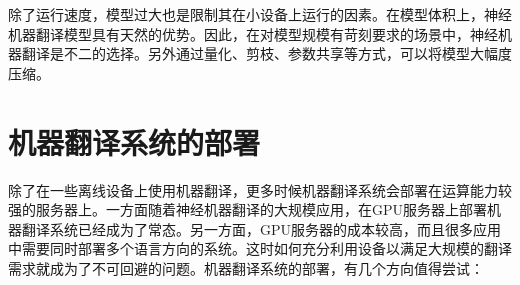 \parinterval 除了运行速度，模型过大也是限制其在小设备上运行的因素。在模型体积上，神经机器翻译模型具有天然的优势。因此，在对模型规模有苛刻要求的场景中，神经机器翻译是不二的选择。另外通过量化、剪枝、参数共享等方式，可以将模型大幅度压缩。

\sectionnewpage
\section{机器翻译系统的部署}

\parinterval 除了在一些离线设备上使用机器翻译，更多时候机器翻译系统会部署在运算能力较强的服务器上。一方面随着神经机器翻译的大规模应用，在GPU服务器上部署机器翻译系统已经成为了常态。另一方面，GPU服务器的成本较高，而且很多应用中需要同时部署多个语言方向的系统。这时如何充分利用设备以满足大规模的翻译需求就成为了不可回避的问题。机器翻译系统的部署，有几个方向值得尝试：

